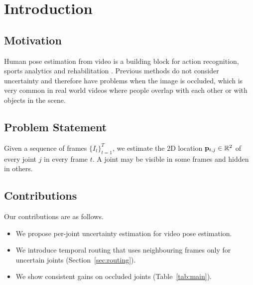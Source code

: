 \section{Introduction}
\label{sec:intro}

\subsection{Motivation}
Human pose estimation from video is a building block for action recognition,
sports analytics and rehabilitation \citep{cao2017realtime}. Previous methods do
not consider uncertainty and therefore have problems when the image is occluded,
which is very common in real world videos where people overlap with each other
or with objects in the scene.

\subsection{Problem Statement}
Given a sequence of frames $\{I_t\}_{t=1}^{T}$, we estimate the 2D location
$\mathbf{p}_{t,j} \in \mathbb{R}^2$ of every joint $j$ in every frame $t$.
A joint may be visible in some frames and hidden in others.

\subsection{Contributions}
Our contributions are as follows.
\begin{itemize}
  \item We propose per-joint uncertainty estimation for video pose estimation.
  \item We introduce temporal routing that uses neighbouring frames only for
        uncertain joints (Section~\ref{sec:routing}).
  \item We show consistent gains on occluded joints (Table~\ref{tab:main}).
\end{itemize}

